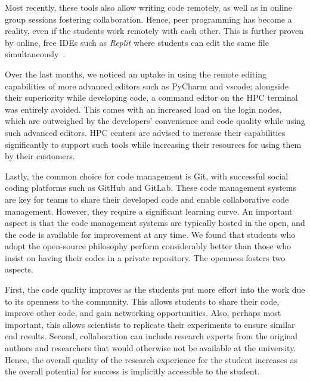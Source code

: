 \documentclass[utf8]{FrontiersinVancouver} %
\begin{document}
Most recently, these tools also allow writing code remotely, as well as in online group sessions fostering collaboration. Hence, peer programming has become a reality, even if the students work remotely with each other. This is further proven by online, free IDEs such as {\em Replit} where students can edit the same file simultaneously~\cite{Kovtaniuk2022}.

Over the last months, we noticed an uptake in using the remote editing capabilities of more advanced editors such as PyCharm and vscode; alongside their superiority while developing code, a command editor on the HPC terminal was entirely avoided. This comes with an increased load on the login nodes, which are outweighed by the developers' convenience and code quality while using such advanced editors. HPC centers are advised to increase their capabilities significantly to support such tools while increasing their resources for using them by their customers.

Lastly, the common choice for code management is Git, with successful social coding platforms such as GitHub and GitLab. These code management systems are key for teams to share their developed code and enable collaborative code management.  However, they require a significant learning curve. An important aspect is that the code management systems are typically hosted in the open, and the code is available for improvement at any time. We found that students who adopt the open-source philosophy perform considerably better than those who insist on having their codes in a private repository. The openness fosters two aspects. 

First, the code quality improves as the students put more effort into the work due to its openness to the community. This allows students to share their code, improve other code, and gain networking opportunities. Also, perhaps most important, this allows scientists to replicate their experiments to ensure similar end results. Second, collaboration can include research experts from the original authors and researchers that would otherwise not be available at the university. Hence, the overall quality of the research experience for the student increases as the overall potential for success is implicitly accessible to the student.
\end{document}

